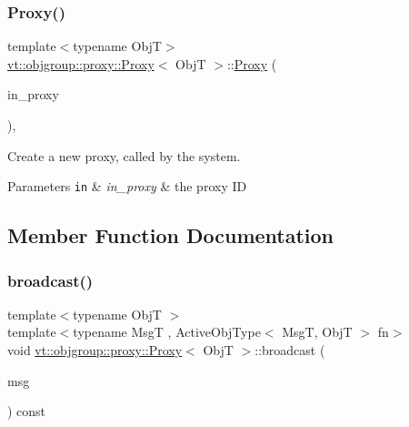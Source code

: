 \subsubsection{\texorpdfstring{Proxy()}{Proxy()}\hspace{0.1cm}{\footnotesize\ttfamily [4/4]}}
{\footnotesize\ttfamily template$<$typename ObjT$>$ \\
\hyperlink{structvt_1_1objgroup_1_1proxy_1_1_proxy}{vt\+::objgroup\+::proxy\+::\+Proxy}$<$ ObjT $>$\+::\hyperlink{structvt_1_1objgroup_1_1proxy_1_1_proxy}{Proxy} (\begin{DoxyParamCaption}\item[{\hyperlink{namespacevt_ad7cae989df485fccca57f0792a880a8e}{Obj\+Group\+Proxy\+Type}}]{in\+\_\+proxy }\end{DoxyParamCaption})\hspace{0.3cm}{\ttfamily [inline]}, {\ttfamily [explicit]}}



Create a new proxy, called by the system. 


\begin{DoxyParams}[1]{Parameters}
\mbox{\tt in}  & {\em in\+\_\+proxy} & the proxy ID \\
\hline
\end{DoxyParams}


\subsection{Member Function Documentation}
\mbox{\label{structvt_1_1objgroup_1_1proxy_1_1_proxy_a0b716ca776b1f06e0d7d45afbe9e5274}} 
\subsubsection{\texorpdfstring{broadcast()}{broadcast()}\hspace{0.1cm}{\footnotesize\ttfamily [1/3]}}
{\footnotesize\ttfamily template$<$typename ObjT $>$ \\
template$<$typename MsgT , Active\+Obj\+Type$<$ Msg\+T, Obj\+T $>$ fn$>$ \\
void \hyperlink{structvt_1_1objgroup_1_1proxy_1_1_proxy}{vt\+::objgroup\+::proxy\+::\+Proxy}$<$ ObjT $>$\+::broadcast (\begin{DoxyParamCaption}\item[{MsgT $\ast$}]{msg }\end{DoxyParamCaption}) const}



